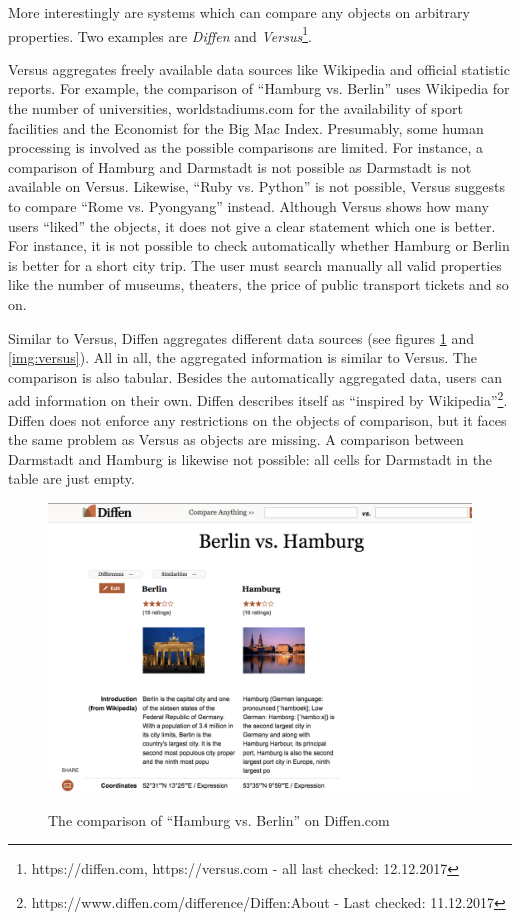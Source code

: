 More interestingly are systems which can compare any objects on arbitrary properties. Two examples are \emph{Diffen} and \emph{Versus}\footnote{https://diffen.com, https://versus.com - all last checked: 12.12.2017}.

Versus aggregates freely available data sources like Wikipedia and official statistic reports. For example, the comparison of \enquote{Hamburg vs. Berlin} uses Wikipedia for the number of universities, worldstadiums.com for the availability of sport facilities and the Economist for the Big Mac Index. Presumably, some human processing is involved as the possible comparisons are limited. For instance, a comparison of Hamburg and Darmstadt is not possible as Darmstadt is not available on Versus. Likewise, \enquote{Ruby vs. Python} is not possible, Versus suggests to compare \enquote{Rome vs. Pyongyang} instead. Although Versus shows how many users \enquote{liked} the objects, it does not give a clear statement which one is better. For instance, it is not possible to check automatically whether Hamburg or Berlin is better for a short city trip. The user must search manually all valid properties like the number of museums, theaters, the price of public transport tickets and so on.

Similar to Versus, Diffen aggregates different data sources (see figures \ref{img:diffen} and \ref{img:versus}). All in all, the aggregated information is similar to Versus. The comparison is also tabular. Besides the automatically aggregated data, users can add information on their own. Diffen describes itself as \enquote{inspired by Wikipedia}\footnote{https://www.diffen.com/difference/Diffen:About - Last checked: 11.12.2017}. Diffen does not enforce any restrictions on the objects of comparison, but it faces the same problem as Versus as objects are missing. A comparison between Darmstadt and Hamburg is likewise not possible: all cells for Darmstadt in the table are just empty.

\begin{figure}[h]
	\includegraphics[width=1\textwidth]{images/ds-sys/diffen}
	\label{img:diffen}
	\caption{The comparison of \enquote{Hamburg vs. Berlin} on Diffen.com}
\end{figure}

